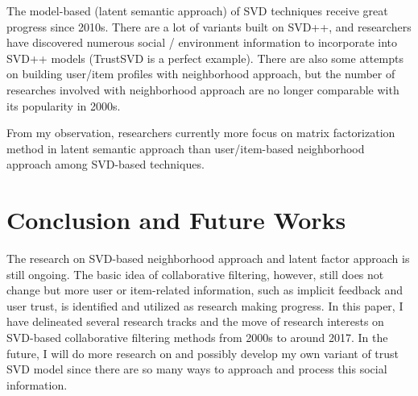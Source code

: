 \documentclass[letter paper, 11pt]{article}
\begin{document}
	
	The model-based (latent semantic approach) of SVD techniques receive great progress since 2010s. There are a lot of variants built on SVD++, and researchers have discovered numerous social / environment information to incorporate into SVD++ models (TrustSVD is a perfect example). There are also some attempts on building user/item profiles with neighborhood approach, but the number of researches involved with neighborhood approach are no longer comparable with its popularity in 2000s.
	
	
	From my observation, researchers currently more focus on matrix factorization method in latent semantic approach than user/item-based neighborhood approach among SVD-based techniques.
	
	\section{Conclusion and Future Works}

	The research on SVD-based neighborhood approach and latent factor approach is still ongoing. The basic idea of collaborative filtering, however, still does not change but more user or item-related information, such as implicit feedback and user trust, is identified and utilized as research making progress. In this paper, I have delineated several research tracks and the move of research interests on SVD-based collaborative filtering methods from 2000s to around 2017. In the future, I will do more research on and possibly develop my own variant of trust SVD model since there are so many ways to approach and process this social information. 

	
	
\end{document}
